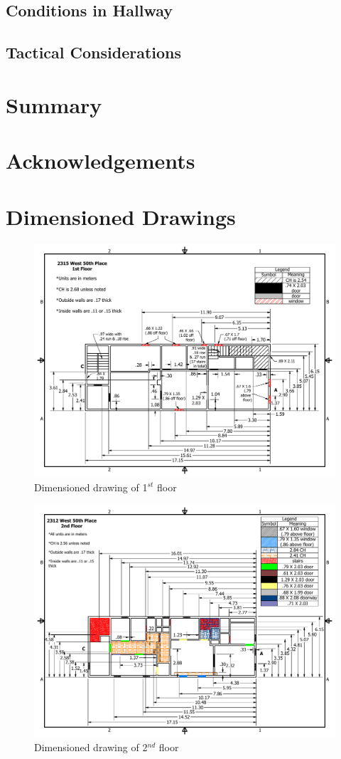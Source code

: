 \documentclass[11pt,oneside]{book}
\begin{document}
\section{Conditions in Hallway}

\section{Tactical Considerations}

\chapter{Summary}

\chapter{Acknowledgements}



\appendix

\chapter{Dimensioned Drawings}

\begin{figure}[h!]
\centering
\includegraphics[width=.80\textwidth]{../Figures/50th_Place_1st_Floor}
\caption {Dimensioned drawing of 1$^{st}$ floor}
\label{fig:first_floor}
\end{figure}

\begin{figure}[h!]
\centering
\includegraphics[width=.80\textwidth]{../Figures/50th_Place_2nd_Floor}
\caption {Dimensioned drawing of 2$^{nd}$ floor}
\label{fig:second_floor}
\end{figure}
\end{document}
